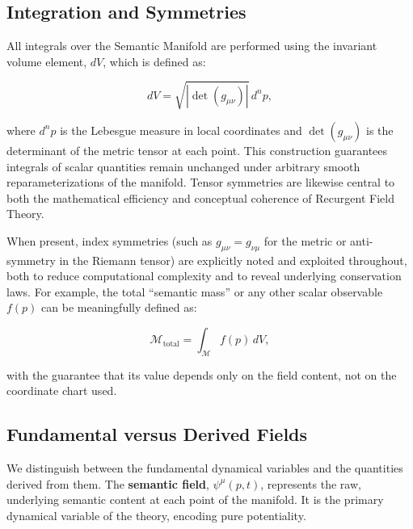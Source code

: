 
\subsection{Integration and Symmetries}
\label{2.4.5:integration_and_symmetries}

All integrals over the Semantic Manifold are performed using the invariant volume element, \(dV\), which is defined as:

\begin{equation}
dV = \sqrt{|\det(g_{\mu\nu})|} \, d^n p,
\end{equation}

where \(d^n p\) is the Lebesgue measure in local coordinates and \(\det(g_{\mu\nu})\) is the determinant of the metric tensor at each point. This construction guarantees integrals of scalar quantities remain unchanged under arbitrary smooth reparameterizations of the manifold. Tensor symmetries are likewise central to both the mathematical efficiency and conceptual coherence of Recurgent Field Theory.

When present, index symmetries (such as \(g_{\mu\nu} = g_{\nu\mu}\) for the metric or anti-symmetry in the Riemann tensor) are explicitly noted and exploited throughout, both to reduce computational complexity and to reveal underlying conservation laws. For example, the total “semantic mass” or any other scalar observable \(f(p)\) can be meaningfully defined as:

\begin{equation}
\mathcal{M}_{\text{total}} = \int_{\mathcal{M}} f(p) \, dV,
\end{equation}

with the guarantee that its value depends only on the field content, not on the coordinate chart used.



\subsection{Fundamental versus Derived Fields}
\label{2.4.6:fundamental_versus_derived_fields}

We distinguish between the fundamental dynamical variables and the quantities derived from them. The \textbf{semantic field}, \(\psi^\mu(p,t)\), represents the raw, underlying semantic content at each point of the manifold. It is the primary dynamical variable of the theory, encoding pure potentiality.

